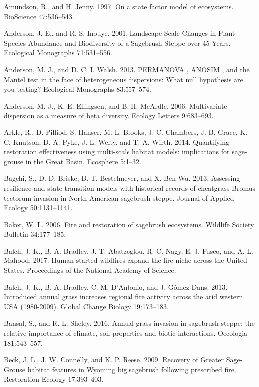 \documentclass[12pt,]{article}
\begin{document}
\hypertarget{ref-Amundson1997}{}
Amundson, R., and H. Jenny. 1997. On a state factor model of ecosystems.
BioScience 47:536--543.

\hypertarget{ref-Anderson2001}{}
Anderson, J. E., and R. S. Inouye. 2001. Landscape-Scale Changes in
Plant Species Abundance and Biodiversity of a Sagebrush Steppe over 45
Years. Ecological Monographs 71:531--556.

\hypertarget{ref-Anderson2013}{}
Anderson, M. J., and D. C. I. Walsh. 2013. PERMANOVA , ANOSIM , and the
Mantel test in the face of heterogeneous dispersions: What null
hypothesis are you testing? Ecological Monographs 83:557--574.

\hypertarget{ref-Anderson2006}{}
Anderson, M. J., K. E. Ellingsen, and B. H. McArdle. 2006. Multivariate
dispersion as a measure of beta diversity. Ecology Letters 9:683--693.

\hypertarget{ref-Arkle2014}{}
Arkle, R., D. Pilliod, S. Hanser, M. L. Brooks, J. C. Chambers, J. B.
Grace, K. C. Knutson, D. A. Pyke, J. L. Welty, and T. A. Wirth. 2014.
Quantifying restoration effectiveness using multi-scale habitat models:
implications for sage-grouse in the Great Basin. Ecosphere 5:1--32.

\hypertarget{ref-Bagchi2013}{}
Bagchi, S., D. D. Briske, B. T. Bestelmeyer, and X. Ben Wu. 2013.
Assessing resilience and state-transition models with historical records
of cheatgrass Bromus tectorum invasion in North American
sagebrush-steppe. Journal of Applied Ecology 50:1131--1141.

\hypertarget{ref-Baker2006}{}
Baker, W. L. 2006. Fire and restoration of sagebrush ecosystems.
Wildlife Society Bulletin 34:177--185.

\hypertarget{ref-Balch2017}{}
Balch, J. K., B. A. Bradley, J. T. Abatzoglou, R. C. Nagy, E. J. Fusco,
and A. L. Mahood. 2017. Human-started wildfires expand the fire niche
across the United States. Proceedings of the National Academy of
Science.

\hypertarget{ref-Balch2013}{}
Balch, J. K., B. A. Bradley, C. M. D'Antonio, and J. Gómez-Dans. 2013.
Introduced annual grass increases regional fire activity across the arid
western USA (1980-2009). Global Change Biology 19:173--183.

\hypertarget{ref-Bansal2016}{}
Bansal, S., and R. L. Sheley. 2016. Annual grass invasion in sagebrush
steppe: the relative importance of climate, soil properties and biotic
interactions. Oecologia 181:543--557.

\hypertarget{ref-Beck2009}{}
Beck, J. L., J. W. Connelly, and K. P. Reese. 2009. Recovery of Greater
Sage-Grouse habitat features in Wyoming big sagebrush following
prescribed fire. Restoration Ecology 17:393--403.
\end{document}

